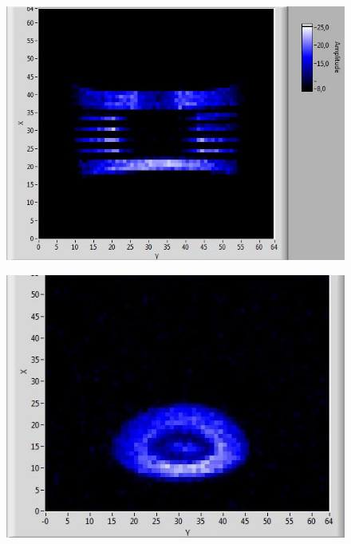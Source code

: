 \documentclass[a4paper]{scrartcl} %
\begin{document}
\begin{figure}[htbp]
{	\parbox{0.48\textwidth}{
		\centering
		\includegraphics[width=1.0 \linewidth]{./Resources/Teil_3/ptfe_vert.JPG}
		\label{fig:2d_teflon}}
	\hfill  
	\parbox{0.48\textwidth}{
		\centering
		\includegraphics[width=1.0 \linewidth]{./Resources/Teil_3/olive_2d.JPG}
		\label{fig:2d_olive}}
		
	\bigskip
	
}
\end{figure}
\end{document}
